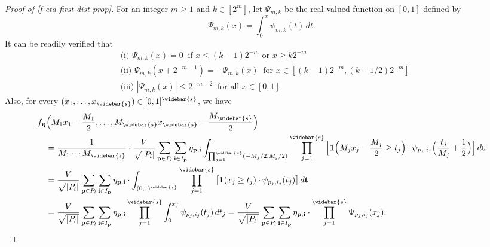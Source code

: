 \documentclass[10pt]{article}
\newcommand{\pbf}{{\mathbf{p}}}
\newcommand{\ibf}{{\mathbf{i}}}
\newcommand{\tbf}{{\mathbf{t}}}
\newcommand{\etabf}{{\boldsymbol{\eta}}}
\newcommand{\ind}{{\mathbf{1}}}
\begin{document}
\begin{proof}[Proof of \eqref{f-eta-first-dist-prop}]
For an integer $m \ge 1$ and $k \in [2^m]$, let $\Psi_{m, k}$ be the 
real-valued function on $[0, 1]$ defined by  
\begin{equation*}
    \Psi_{m, k}(x) = \int_{0}^{x} \psi_{m, k}(t) \, dt.
\end{equation*}
It can be readily verified that
\begin{equation}\label{psi-properties}
\begin{aligned}
    &\text{(i) } \Psi_{m, k}(x) = 0 
    \ \text{ if } x \le (k-1)2^{-m} \text{ or } x \ge k2^{-m} \\
    &\text{(ii) } \Psi_{m, k}(x + 2^{-m - 1}) = -\Psi_{m, k}(x) 
    \ \text{ for } x \in [(k-1) 2^{-m}, (k - 1/2) 2^{-m}] \\
    &\text{(iii) } |\Psi_{m, k}(x)| \le 2^{-m-2} 
    \ \text{ for all } x \in [0, 1].
\end{aligned}
\end{equation}
Also, for every $(x_1, \dots, x_{\widebar{s}}) 
\in [0, 1]^{\widebar{s}}$, we have
\begin{align}\label{f-eta-alt-rep}
    &f_{\etabf}\Big(M_1 x_1 - \frac{M_1}{2}, \dots, 
    M_{\widebar{s}} x_{\widebar{s}} - \frac{M_{\widebar{s}}}{2}\Big) 
    \nonumber \\
    &\quad = \frac{1}{M_1 \cdots M_{\widebar{s}}} 
    \cdot \frac{V}{\sqrt{|P_l|}} 
    \sum_{\pbf \in P_l} \sum_{\ibf \in I_{\pbf}} 
    \eta_{\pbf, \ibf} 
    \int_{\prod_{j = 1}^{\widebar{s}} (-M_j/2, M_j/2)} 
    \prod_{j = 1}^{\widebar{s}} \Big[
    \ind\Big(M_j x_j - \frac{M_j}{2} \ge t_j\Big) \cdot 
    \psi_{p_j, i_j}\Big(\frac{t_j}{M_j} + \frac{1}{2}\Big)\Big] 
    \, d\tbf \nonumber \\
    &\quad = \frac{V}{\sqrt{|P_l|}} \sum_{\pbf \in P_l} 
    \sum_{\ibf \in I_{\pbf}} \eta_{\pbf, \ibf} 
    \cdot \int_{(0, 1)^{\widebar{s}}} \prod_{j = 1}^{\widebar{s}} 
    \big[\ind(x_j \ge t_j) \cdot \psi_{p_j, i_j}(t_j)\big] 
    \, d\tbf \nonumber \\
    &\quad = \frac{V}{\sqrt{|P_l|}} \sum_{\pbf \in P_l} 
    \sum_{\ibf \in I_{\pbf}} 
    \eta_{\pbf, \ibf} \prod_{j = 1}^{\widebar{s}} 
    \int_{0}^{x_j} \psi_{p_j, i_j}(t_j) \, dt_j 
    = \frac{V}{\sqrt{|P_l|}} \sum_{\pbf \in P_l} 
    \sum_{\ibf \in I_{\pbf}} 
    \eta_{\pbf, \ibf} 
    \cdot \prod_{j = 1}^{\widebar{s}} \Psi_{p_j, i_j}(x_j).
\end{align}


\end{proof}
\end{document}
